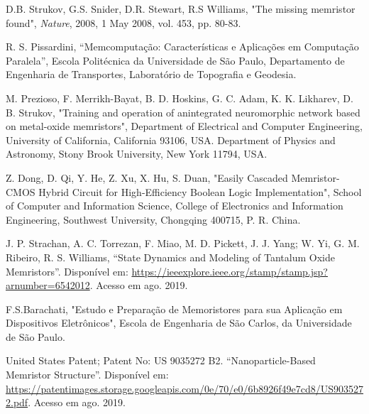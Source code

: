 \documentclass{ceel}
\begin{document}
\begin{multicols}{2}
\begin{thebibliography}{9}
     D.B. Strukov, G.S. Snider, D.R. Stewart,  R.S Williams, 
"The missing memristor found", 
\emph{Nature}, 2008, 1 May 2008, vol. 453, pp. 80-83.

    R. S. Pissardini,
    “Memcomputação: Características e Aplicações em Computação Paralela”, 
    Escola Politécnica da Universidade de São Paulo, Departamento de Engenharia de Transportes, Laboratório de Topografia e Geodesia.
 
   M. Prezioso, F. Merrikh-Bayat, B. D. Hoskins, G. C. Adam, K. K. Likharev, D. B. Strukov, "Training and operation of anintegrated neuromorphic
network based on metal-oxide memristors", 
Department of Electrical and Computer Engineering, University of California, California 93106, USA. 
Department of Physics and Astronomy, Stony Brook University, New York 11794, USA. 

    Z. Dong, D. Qi, Y. He, Z. Xu, X. Hu, S. Duan, "Easily Cascaded Memristor-CMOS Hybrid Circuit
for High-Efficiency Boolean Logic Implementation", School of Computer and Information Science,
College of Electronics and Information Engineering,
Southwest University, Chongqing 400715, P. R. China.

    J. P. Strachan, A. C. Torrezan, F. Miao, M. D. Pickett, J. J. Yang; W. Yi, G. M. Ribeiro, R. S. Williams,
 “State Dynamics and Modeling of
Tantalum Oxide Memristors”. 
Disponível em: 
\url{https://ieeexplore.ieee.org/stamp/stamp.jsp?arnumber=6542012}. Acesso em ago. 2019.

   F.S.Barachati, "Estudo e Preparação de Memoristores para sua Aplicação em Dispositivos Eletrônicos", Escola de Engenharia de São Carlos, da Universidade de São Paulo. 

    United States Patent; Patent No: US 9035272 B2.
    “Nanoparticle-Based Memristor Structure”. 
    Disponível em: 
\url{https://patentimages.storage.googleapis.com/0e/70/e0/6b8926f49e7cd8/US9035272.pdf}. Acesso em ago. 2019.


\end{thebibliography}
\end{multicols}
\end{document}
